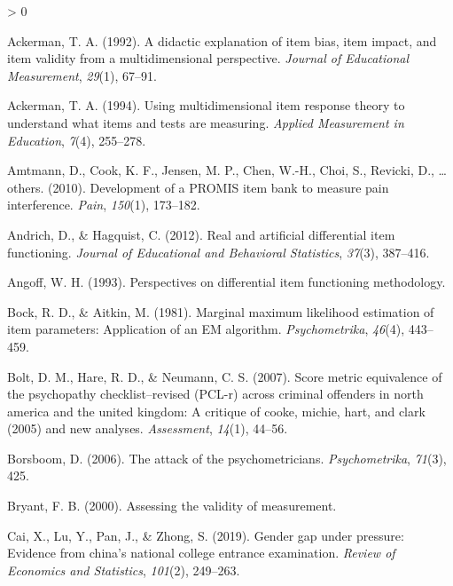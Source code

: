\documentclass[
  english,
  man,floatsintext]{apa6}
\newlength{\cslhangindent}
\newenvironment{CSLReferences}[2] %
 {%
  \setlength{\parindent}{0pt}
  \ifodd #1 \everypar{\setlength{\hangindent}{\cslhangindent}}\ignorespaces\fi
  \ifnum #2 > 0
  \setlength{\parskip}{#2\baselineskip}
  \fi
 }%
 {}
\begin{document}
\hypertarget{refs}{}
\begin{CSLReferences}{1}{0}
\leavevmode\hypertarget{ref-ackerman1992didactic}{}%
Ackerman, T. A. (1992). A didactic explanation of item bias, item impact, and item validity from a multidimensional perspective. \emph{Journal of Educational Measurement}, \emph{29}(1), 67--91.

\leavevmode\hypertarget{ref-ackerman1994using}{}%
Ackerman, T. A. (1994). Using multidimensional item response theory to understand what items and tests are measuring. \emph{Applied Measurement in Education}, \emph{7}(4), 255--278.

\leavevmode\hypertarget{ref-amtmann2010development}{}%
Amtmann, D., Cook, K. F., Jensen, M. P., Chen, W.-H., Choi, S., Revicki, D., \ldots{} others. (2010). Development of a PROMIS item bank to measure pain interference. \emph{Pain}, \emph{150}(1), 173--182.

\leavevmode\hypertarget{ref-andrich2012real}{}%
Andrich, D., \& Hagquist, C. (2012). Real and artificial differential item functioning. \emph{Journal of Educational and Behavioral Statistics}, \emph{37}(3), 387--416.

\leavevmode\hypertarget{ref-angoff1993perspectives}{}%
Angoff, W. H. (1993). Perspectives on differential item functioning methodology.

\leavevmode\hypertarget{ref-bock1981marginal}{}%
Bock, R. D., \& Aitkin, M. (1981). Marginal maximum likelihood estimation of item parameters: Application of an EM algorithm. \emph{Psychometrika}, \emph{46}(4), 443--459.

\leavevmode\hypertarget{ref-bolt2007score}{}%
Bolt, D. M., Hare, R. D., \& Neumann, C. S. (2007). Score metric equivalence of the psychopathy checklist--revised (PCL-r) across criminal offenders in north america and the united kingdom: A critique of cooke, michie, hart, and clark (2005) and new analyses. \emph{Assessment}, \emph{14}(1), 44--56.

\leavevmode\hypertarget{ref-borsboom2006attack}{}%
Borsboom, D. (2006). The attack of the psychometricians. \emph{Psychometrika}, \emph{71}(3), 425.

\leavevmode\hypertarget{ref-bryant2000assessing}{}%
Bryant, F. B. (2000). Assessing the validity of measurement.

\leavevmode\hypertarget{ref-cai2019gender}{}%
Cai, X., Lu, Y., Pan, J., \& Zhong, S. (2019). Gender gap under pressure: Evidence from china's national college entrance examination. \emph{Review of Economics and Statistics}, \emph{101}(2), 249--263.


\end{CSLReferences}
\end{document}
